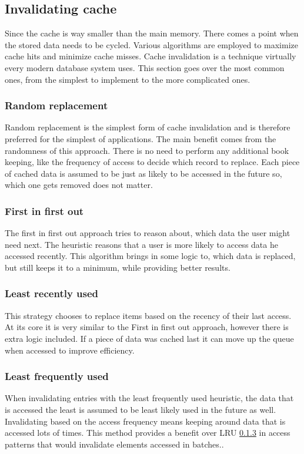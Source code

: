 \documentclass[10pt,twoside,a4paper]{article}
\begin{document}
\subsection{Invalidating cache}
Since the cache is way smaller than the main memory. There comes a point when the stored data needs to be cycled. Various algorithms are employed to maximize cache hits and minimize cache misses. Cache invalidation is a technique virtually every modern database system uses. \cite{Redis} This section goes over the most common ones, from the simplest to implement to the more complicated ones. \cite{755618}

\subsubsection{Random replacement}
Random replacement is the simplest form of cache invalidation and is therefore preferred for the simplest of applications. The main benefit comes from the randomness of this approach. There is no need to perform any additional book keeping, like the frequency of access to decide which record to replace. Each piece of cached data is assumed to be just as likely to be accessed in the future so, which one gets removed does not matter.

\subsubsection{First in first out}
The first in first out approach tries to reason about, which data the user might need next. The heuristic reasons that a user is more likely to access data he accessed recently. This algorithm brings in some logic to, which data is replaced, but still keeps it to a minimum, while providing better results.

\subsubsection{Least recently used}
\label{sec:lru}
This strategy chooses to replace items based on the recency of their last access. At its core it is very similar to the First in first out approach, however there is extra logic included. If a piece of data was cached last it can move up the queue when accessed to improve efficiency.

\subsubsection{Least frequently used}
When invalidating entries with the least frequently used heuristic, the data that is accessed the least is assumed to be least likely used in the future as well. Invalidating based on the access frequency means keeping around data that is accessed lots of times. This method provides a benefit over LRU \ref{sec:lru} in access patterns that would invalidate elements accessed in batches.\cite{chand2019comparative}\cite{comparison-cache-replacement}.
\end{document}
